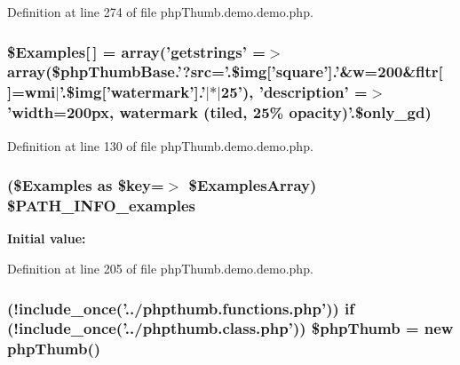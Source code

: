 \-Definition at line 274 of file php\-Thumb.\-demo.\-demo.\-php.

\hypertarget{php_thumb_8demo_8demo_8php_a0458257a46c0f4f29d06a61ceac10a14}{
\subsubsection[{\$\-Examples}]{\setlength{\rightskip}{0pt plus 5cm}\$\-Examples\mbox{[}$\,$\mbox{]} = array('getstrings' =$>$ array(\$php\-Thumb\-Base.'?src='.\$img\mbox{[}'square'\mbox{]}.'\&w=200\&fltr\mbox{[}$\,$\mbox{]}=wmi$|$'.\$img\mbox{[}'watermark'\mbox{]}.'$|$$\ast$$|$25'), 'description' =$>$ 'width=200px, watermark (tiled, 25\% opacity)'.\$only\-\_\-gd)}}\label{php_thumb_8demo_8demo_8php_a0458257a46c0f4f29d06a61ceac10a14}


\-Definition at line 130 of file php\-Thumb.\-demo.\-demo.\-php.

\hypertarget{php_thumb_8demo_8demo_8php_a0958f5f6c06d10b73ec01ffc96a54f8d}{
\subsubsection[{\$\-P\-A\-T\-H\-\_\-\-I\-N\-F\-O\-\_\-examples}]{ (\$\-Examples as \$key=$>$ \$\-Examples\-Array) \$\-P\-A\-T\-H\-\_\-\-I\-N\-F\-O\-\_\-examples}}\label{php_thumb_8demo_8demo_8php_a0958f5f6c06d10b73ec01ffc96a54f8d}
{\bfseries \-Initial value\-:}


\-Definition at line 205 of file php\-Thumb.\-demo.\-demo.\-php.

\hypertarget{php_thumb_8demo_8demo_8php_aa255ed2e2f11993a251707f14a754498}{
\subsubsection[{\$php\-Thumb}]{ (!include\-\_\-once('../phpthumb.\-functions.\-php')) {\bf if} (!include\-\_\-once('../phpthumb.\-class.\-php')) \$php\-Thumb = new php\-Thumb()}}\label{php_thumb_8demo_8demo_8php_aa255ed2e2f11993a251707f14a754498}


